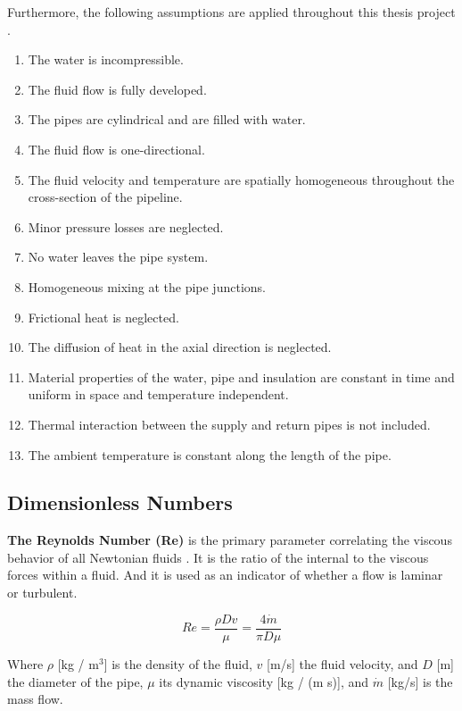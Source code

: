 Furthermore, the following assumptions are applied throughout this thesis project \cite{MAURER2021244,sibeijn2025economic,KUNTUAROVA,PipePDE}.
\begin{enumerate}
    \item The water is incompressible. 
    \item The fluid flow is fully developed.
    \item The pipes are cylindrical and are filled with water.
    \item The fluid flow is one-directional. 
    \item The fluid velocity and temperature are spatially homogeneous throughout the cross-section of the pipeline.
    \item Minor pressure losses are neglected.
    \item No water leaves the pipe system.
    \item Homogeneous mixing at the pipe junctions.

    \item Frictional heat is neglected.
    \item The diffusion of heat in the axial direction is neglected.
    \item Material properties of the water, pipe and insulation are constant in time and uniform in space and temperature independent. 
    \item Thermal interaction between the supply and return pipes is not included.
    \item The ambient temperature is constant along the length of the pipe.
\end{enumerate}

\subsection{Dimensionless Numbers}
\textbf{The Reynolds Number (Re)} is the primary parameter correlating the viscous behavior of all Newtonian fluids \cite{white2011fluid}. It is the ratio of the internal to the viscous forces within a fluid. And it is used as an indicator of whether a flow is laminar or turbulent. 

\begin{equation}\label{eq::Re}
R e=\frac{\rho D v}{\mu}=\frac{4 \dot{m}}{\pi D \mu}
\end{equation}

Where $\rho$ [kg / m$^3$] is the density of the fluid, $v$ [m/s] the fluid velocity, and $D$ [m] the diameter of the pipe, $\mu$ its dynamic viscosity [kg / (m s)], and $\dot{m}$ [kg/s] is the mass flow. 

